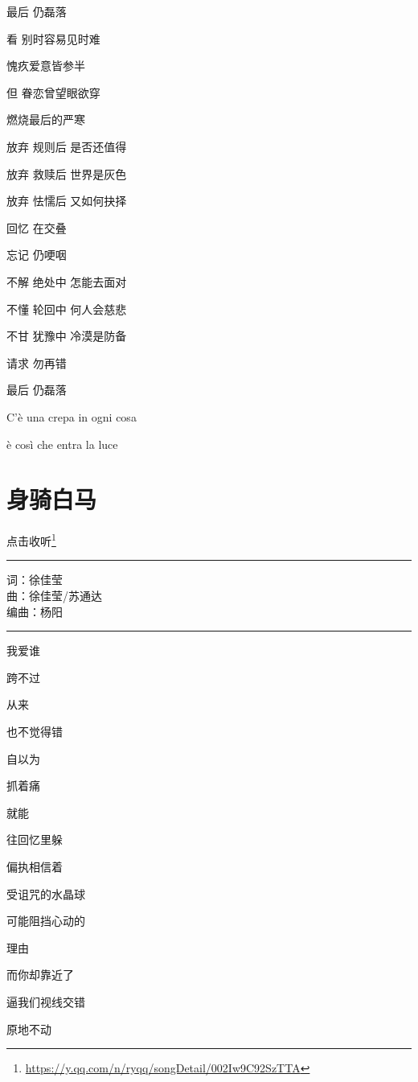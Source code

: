 \documentclass[]{ctexbook}
\renewcommand{\href}[2]{#2\footnote{\url{#1}}}
\begin{document}
最后 仍磊落

看 别时容易见时难

愧疚爱意皆参半

但 眷恋曾望眼欲穿

燃烧最后的严寒

放弃 规则后 是否还值得

放弃 救赎后 世界是灰色

放弃 怯懦后 又如何抉择

回忆 在交叠

忘记 仍哽咽

不解 绝处中 怎能去面对

不懂 轮回中 何人会慈悲

不甘 犹豫中 冷漠是防备

请求 勿再错

最后 仍磊落

C'è una crepa in ogni cosa

è così che entra la luce

\section*{身骑白马}\label{on-the-white-horse}


\href{https://y.qq.com/n/ryqq/songDetail/002Iw9C92SzTTA}{点击收听}

\begin{center}\rule{0.5\linewidth}{0.5pt}\end{center}

词：徐佳莹\\
曲：徐佳莹/苏通达\\
编曲：杨阳

\begin{center}\rule{0.5\linewidth}{0.5pt}\end{center}

我爱谁

跨不过

从来

也不觉得错

自以为

抓着痛

就能

往回忆里躲

偏执相信着

受诅咒的水晶球

可能阻挡心动的

理由

而你却靠近了

逼我们视线交错

原地不动
\end{document}
